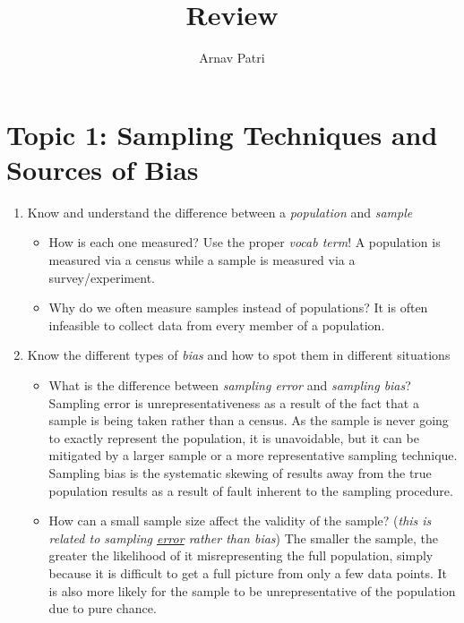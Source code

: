 \documentclass[12pt, A4]{report}
\title{Review}
\author{Arnav Patri}
\begin{document}
	\maketitle
	\tableofcontents
		\chapter*{Topic 1: Sampling Techniques and Sources of Bias}
			\begin{enumerate}
				\item 
					Know and understand the difference between a \emph{population} and \emph{sample}
						\begin{itemize}
							\item 
								How is each one measured? Use the proper \emph{vocab term}!
									\subitem
										A population is measured via a census while a sample is measured via a survey/experiment.
							\item
								Why do we often measure samples instead of populations?
									\subitem
										It is often infeasible to collect data from every member of a population.
						\end{itemize}
				\item
					Know the different types of \emph{bias} and how to spot them in different situations
						\begin{itemize}
							\item
								What is the difference between \emph{sampling error} and \emph{sampling bias}?
									\subitem
										Sampling error is unrepresentativeness as a result of the fact that a sample is being taken rather than a census. As	the sample is never going to exactly represent the population, it is unavoidable, but it can be mitigated by a larger sample or a more representative sampling technique. Sampling bias is the systematic skewing of results away from the true population results as a result of fault inherent to the sampling procedure.
							\item
								How can a small sample size affect the validity of the sample? (\emph{this is related to sampling \underline{error} rather than bias})
									\subitem
										The smaller the sample, the greater the likelihood of it misrepresenting the full population, simply because it is difficult to get a full picture from only a few data points. It is also more likely for the sample to be unrepresentative of the population due to pure chance.
						\end{itemize}
			\end{enumerate}
\end{document}
